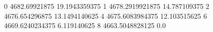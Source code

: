 0 4682.69921875 19.1943359375
1 4678.2919921875 14.787109375
2 4676.654296875 13.1494140625
4 4675.6083984375 12.103515625
6 4669.6240234375 6.119140625
8 4663.5048828125 0.0
